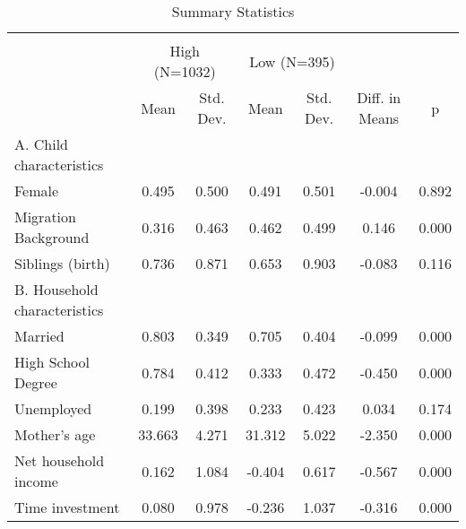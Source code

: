 \begin{table}[!htbp]
	\centering
	\begin{threeparttable}
		\caption{Summary Statistics}
		\label{tab:summ_stats}
		\begin{tabular}[t]{lcccccc}
			\hline\hline\\[-1.8ex] 
			\multicolumn{1}{c}{ } & \multicolumn{2}{c}{High (N=1032)} & \multicolumn{2}{c}{Low (N=395)} & \multicolumn{1}{c}{    } & \multicolumn{1}{c}{    } \\
			\cmidrule(l{3pt}r{3pt}){2-3} \cmidrule(l{3pt}r{3pt}){4-5}
			& Mean & Std. Dev. & Mean  & Std. Dev.  & Diff. in Means & p\\
			\midrule
			A. Child characteristics &&&&&&           \\
			\hspace{4mm}Female & 0.495 & 0.500 & 0.491 & 0.501 & -0.004 & 0.892\\
			\hspace{4mm}Migration Background & 0.316 & 0.463 & 0.462 & 0.499 & 0.146 & 0.000\\
			\hspace{4mm}Siblings (birth) & 0.736 & 0.871 & 0.653 & 0.903 & -0.083 & 0.116\\
			B. Household characteristics &&&&&&           \\
			\hspace{4mm}Married & 0.803 & 0.349 & 0.705 & 0.404 & -0.099 & 0.000\\
			\hspace{4mm}High School Degree & 0.784 & 0.412 & 0.333 & 0.472 & -0.450 & 0.000\\
			\hspace{4mm}Unemployed & 0.199 & 0.398 & 0.233 & 0.423 & 0.034 & 0.174\\
			\hspace{4mm}Mother's age & 33.663 & 4.271 & 31.312 & 5.022 & -2.350 & 0.000\\
			\hspace{4mm}Net household income & 0.162 & 1.084 & -0.404 & 0.617 & -0.567 & 0.000\\
			\hspace{4mm}Time investment & 0.080 & 0.978 & -0.236 & 1.037 & -0.316 & 0.000\\

\end{tabular}
\end{threeparttable}
\end{table}
